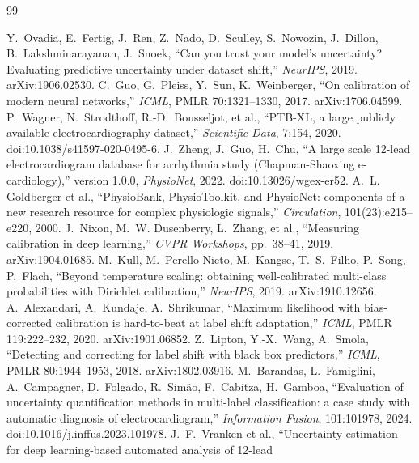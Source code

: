 \documentclass[12pt]{article}
\begin{document}
\begin{thebibliography}{99}
\raggedright
 Y.~Ovadia, E.~Fertig, J.~Ren, Z.~Nado,
D.~Sculley, S.~Nowozin, J.~Dillon, B.~Lakshminarayanan, J.~Snoek,
``Can you trust your model's uncertainty? Evaluating predictive
uncertainty under dataset shift,'' \emph{NeurIPS}, 2019.
arXiv:1906.02530.
 C.~Guo, G.~Pleiss, Y.~Sun, K.~Weinberger,
``On calibration of modern neural networks,'' \emph{ICML}, PMLR
70:1321--1330, 2017. arXiv:1706.04599.
 P.~Wagner, N.~Strodthoff, R.-D.~Bousseljot,
et al., ``PTB-XL, a large publicly available electrocardiography
dataset,'' \emph{Scientific Data}, 7:154, 2020.
doi:10.1038/s41597-020-0495-6.
 J.~Zheng, J.~Guo, H.~Chu,
``A large scale 12-lead electrocardiogram database for arrhythmia
study (Chapman-Shaoxing e-cardiology),'' version 1.0.0,
\emph{PhysioNet}, 2022. doi:10.13026/wgex-er52.
 A.~L. Goldberger et al., ``PhysioBank,
PhysioToolkit, and PhysioNet: components of a new research resource
for complex physiologic signals,'' \emph{Circulation},
101(23):e215--e220, 2000.
 J.~Nixon, M.~W. Dusenberry, L.~Zhang, et al.,
``Measuring calibration in deep learning,'' \emph{CVPR Workshops},
pp.~38--41, 2019. arXiv:1904.01685.
 M.~Kull, M.~Perello-Nieto, M.~Kangse,
T.~S.~Filho, P.~Song, P.~Flach, ``Beyond temperature scaling:
obtaining well-calibrated multi-class probabilities with Dirichlet
calibration,'' \emph{NeurIPS}, 2019. arXiv:1910.12656.
 A.~Alexandari, A.~Kundaje, A.~Shrikumar,
``Maximum likelihood with bias-corrected calibration is hard-to-beat
at label shift adaptation,'' \emph{ICML}, PMLR 119:222--232, 2020.
arXiv:1901.06852.
 Z.~Lipton, Y.-X.~Wang, A.~Smola,
``Detecting and correcting for label shift with black box
predictors,'' \emph{ICML}, PMLR 80:1944--1953, 2018.
arXiv:1802.03916.
 M.~Barandas, L.~Famiglini, A.~Campagner,
D.~Folgado, R.~Sim\~ao, F.~Cabitza, H.~Gamboa, ``Evaluation of
uncertainty quantification methods in multi-label classification: a
case study with automatic diagnosis of electrocardiogram,''
\emph{Information Fusion}, 101:101978, 2024.
doi:10.1016/j.inffus.2023.101978.
 J.~F.~Vranken et al., ``Uncertainty estimation for
deep learning-based automated analysis of 12-lead

\end{thebibliography}
\end{document}

